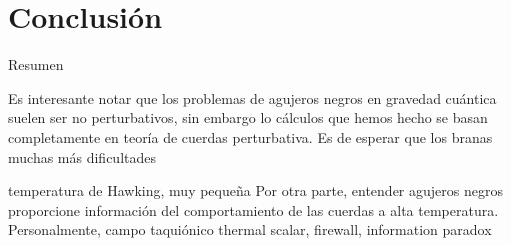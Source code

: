 \chapter{Conclusión}

Resumen

Es interesante notar que los problemas de agujeros negros en gravedad cuántica suelen ser
no perturbativos, sin embargo lo cálculos que hemos hecho se basan completamente en teoría de 
cuerdas perturbativa.
Es de esperar que los branas muchas más dificultades

temperatura de Hawking, muy pequeña 
Por otra parte, entender agujeros negros proporcione información del comportamiento de las
cuerdas a alta temperatura.
Personalmente, campo taquiónico thermal scalar, firewall, information paradox



